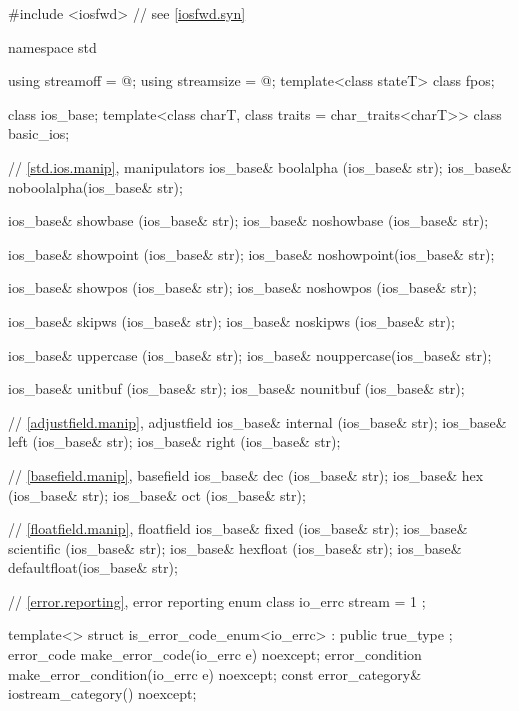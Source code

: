 \begin{codeblock}
#include <iosfwd>   // see \ref{iosfwd.syn}

namespace std {
  using streamoff  = @\impdef@;
  using streamsize = @\impdef@;
  template<class stateT> class fpos;

  class ios_base;
  template<class charT, class traits = char_traits<charT>>
    class basic_ios;

  // \ref{std.ios.manip}, manipulators
  ios_base& boolalpha  (ios_base& str);
  ios_base& noboolalpha(ios_base& str);

  ios_base& showbase   (ios_base& str);
  ios_base& noshowbase (ios_base& str);

  ios_base& showpoint  (ios_base& str);
  ios_base& noshowpoint(ios_base& str);

  ios_base& showpos    (ios_base& str);
  ios_base& noshowpos  (ios_base& str);

  ios_base& skipws     (ios_base& str);
  ios_base& noskipws   (ios_base& str);

  ios_base& uppercase  (ios_base& str);
  ios_base& nouppercase(ios_base& str);

  ios_base& unitbuf    (ios_base& str);
  ios_base& nounitbuf  (ios_base& str);

  // \ref{adjustfield.manip}, adjustfield
  ios_base& internal   (ios_base& str);
  ios_base& left       (ios_base& str);
  ios_base& right      (ios_base& str);

  // \ref{basefield.manip}, basefield
  ios_base& dec        (ios_base& str);
  ios_base& hex        (ios_base& str);
  ios_base& oct        (ios_base& str);

  // \ref{floatfield.manip}, floatfield
  ios_base& fixed      (ios_base& str);
  ios_base& scientific (ios_base& str);
  ios_base& hexfloat   (ios_base& str);
  ios_base& defaultfloat(ios_base& str);

  // \ref{error.reporting}, error reporting
  enum class io_errc {
    stream = 1
  };

  template<> struct is_error_code_enum<io_errc> : public true_type { };
  error_code make_error_code(io_errc e) noexcept;
  error_condition make_error_condition(io_errc e) noexcept;
  const error_category& iostream_category() noexcept;
}
\end{codeblock}
%
%
%
%
%

